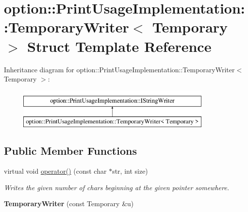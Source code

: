 \hypertarget{structoption_1_1_print_usage_implementation_1_1_temporary_writer}{}\section{option\+:\+:Print\+Usage\+Implementation\+:\+:Temporary\+Writer$<$ Temporary $>$ Struct Template Reference}
\label{structoption_1_1_print_usage_implementation_1_1_temporary_writer}
Inheritance diagram for option\+:\+:Print\+Usage\+Implementation\+:\+:Temporary\+Writer$<$ Temporary $>$\+:\begin{figure}[H]
\begin{center}
\leavevmode
\includegraphics[height=2.000000cm]{structoption_1_1_print_usage_implementation_1_1_temporary_writer}
\end{center}
\end{figure}
\subsection*{Public Member Functions}
\begin{DoxyCompactItemize}
\item 
\mbox{\label{structoption_1_1_print_usage_implementation_1_1_temporary_writer_a674751ddfff63852b36c754878276b02}} 
virtual void \hyperlink{structoption_1_1_print_usage_implementation_1_1_temporary_writer_a674751ddfff63852b36c754878276b02}{operator()} (const char $\ast$str, int size)
\begin{DoxyCompactList}\small\item\em Writes the given number of chars beginning at the given pointer somewhere. \end{DoxyCompactList}\item 
\mbox{\label{structoption_1_1_print_usage_implementation_1_1_temporary_writer_a0c65740b5a897ca2a2465d1c112882a8}} 
{\bfseries Temporary\+Writer} (const Temporary \&u)
\end{DoxyCompactItemize}
